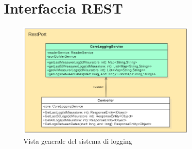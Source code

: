 \section{Interfaccia REST}

\begin{figure}[ht]
    \centering
    \includegraphics[width=0.8\textwidth]{img/classi_logging_port_rest.png}
    \caption{Vista generale del sistema di logging}
    \label{fig:general_logging}
\end{figure}


